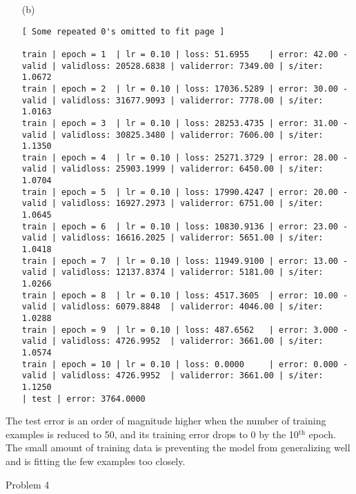 \documentclass{article}
\begin{document}
\begin{itemize}
\begin{landscape}
\begin{itemize}
\begin{Verbatim}[fontsize=\small]
	\end{Verbatim}
	
	\item[(b)]
	
	\begin{Verbatim}[fontsize=\small]
	[ Some repeated 0's omitted to fit page ]
		
train | epoch = 1  | lr = 0.10 | loss: 51.6955    | error: 42.00 - valid | validloss: 20528.6838 | validerror: 7349.00 | s/iter: 1.0672	
train | epoch = 2  | lr = 0.10 | loss: 17036.5289 | error: 30.00 - valid | validloss: 31677.9093 | validerror: 7778.00 | s/iter: 1.0163	
train | epoch = 3  | lr = 0.10 | loss: 28253.4735 | error: 31.00 - valid | validloss: 30825.3480 | validerror: 7606.00 | s/iter: 1.1350	
train | epoch = 4  | lr = 0.10 | loss: 25271.3729 | error: 28.00 - valid | validloss: 25903.1999 | validerror: 6450.00 | s/iter: 1.0704	
train | epoch = 5  | lr = 0.10 | loss: 17990.4247 | error: 20.00 - valid | validloss: 16927.2973 | validerror: 6751.00 | s/iter: 1.0645	
train | epoch = 6  | lr = 0.10 | loss: 10830.9136 | error: 23.00 - valid | validloss: 16616.2025 | validerror: 5651.00 | s/iter: 1.0418	
train | epoch = 7  | lr = 0.10 | loss: 11949.9100 | error: 13.00 - valid | validloss: 12137.8374 | validerror: 5181.00 | s/iter: 1.0266	
train | epoch = 8  | lr = 0.10 | loss: 4517.3605  | error: 10.00 - valid | validloss: 6079.8848  | validerror: 4046.00 | s/iter: 1.0288	
train | epoch = 9  | lr = 0.10 | loss: 487.6562   | error: 3.000 - valid | validloss: 4726.9952  | validerror: 3661.00 | s/iter: 1.0574	
train | epoch = 10 | lr = 0.10 | loss: 0.0000     | error: 0.000 - valid | validloss: 4726.9952  | validerror: 3661.00 | s/iter: 1.1250	
| test | error: 3764.0000
	\end{Verbatim}	
	\end{itemize}
\end{landscape}

The test error is an order of magnitude higher when the number of training examples is reduced to 50, and its training error drops to 0
by the 10$^\text{th}$ epoch. The small amount of training data is preventing the model from generalizing well and is fitting the few examples
too closely.

\newpage
{}	
\thispagestyle{empty}
\begin{landscape}

\item[Problem 4]

	\begin{itemize}
	

\end{itemize}
\end{landscape}
\end{itemize}
\end{document}
